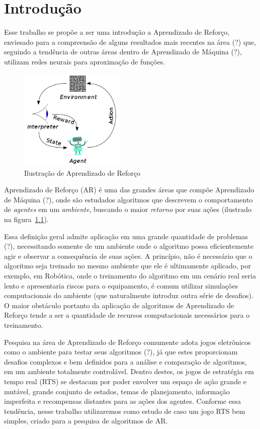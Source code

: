 \chapter{Introdução}
\label{cap:introducao}

Esse trabalho se propõe a ser uma introdução a Aprendizado de Reforço, enviesado para a compreensão de alguns resultados mais recentes na área (?) que, seguindo a tendência de outras áreas dentro de Aprendizado de Máquina (?), utilizam redes neurais para aproximação de funções.

\begin{figure}
    \centering
        \includegraphics[width=5cm]{figuras/rl}
    \caption{Ilustração de Aprendizado de Reforço}
    \label{fig:rl}
\end{figure}

Aprendizado de Reforço (AR) é uma das grandes áreas que compõe Aprendizado de Máquina (?),
onde são estudados algoritmos que descrevem o comportamento de \textit{agentes} em um \textit{ambiente},
buscando o maior \textit{retorno} por suas ações (ilustrado na figura~\ref{fig:rl}).

Essa definição geral admite aplicação em uma grande quantidade de problemas (?), 
necessitando somente de um ambiente onde o algoritmo possa eficientemente agir e observar a consequência de suas ações. A princípio, não é necessário que o algoritmo seja treinado no mesmo ambiente que ele é ultimamente aplicado, por exemplo, em Robótica, onde o treinamento do algoritmo em um cenário real seria lento e apresentaria riscos para o equipamento, é comum utilizar simulações computacionais do ambiente (que naturalmente introduz outra série de desafios). O maior obstáculo portanto da aplicação de algoritmos de Aprendizado de Reforço tende a ser a quantidade de recursos computacionais necessários para o treinamento.

Pesquisa na área de Aprendizado de Reforço comumente adota jogos eletrônicos como o ambiente para testar seus algoritmos (?), já que estes proporcionam desafios complexos e bem definidos para a análise e comparação de algoritmos, em um ambiente totalmente controlável. Dentro destes, os jogos de estratégia em tempo real (RTS) se destacam por poder envolver um espaço de ação grande e mutável, grande conjunto de estados, temas de planejamento, informação imperfeita e recompensas distantes para as ações dos agentes. Conforme essa tendência, nesse trabalho utilizaremos como estudo de caso um jogo RTS bem simples, criado para a pesquisa de algoritmos de AR.

